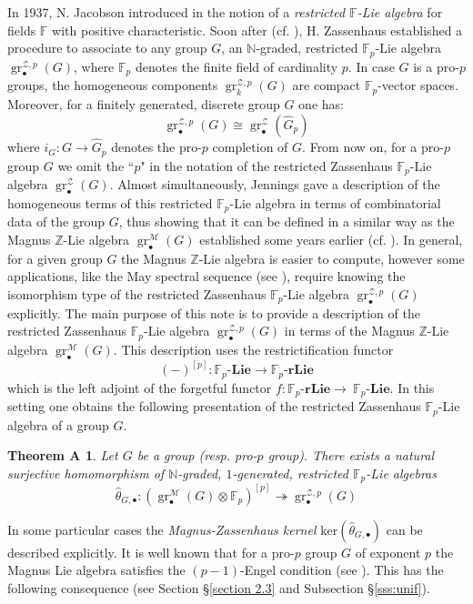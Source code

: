 \documentclass{amsart}
\theoremstyle{plain}
\newtheorem*{thmA}{Theorem A}
\theoremstyle{definition}
\numberwithin{theorem}{section}
\numberwithin{equation}{section}
\newcommand{\gr}{\operatorname{gr}}
\newcommand{\grM}{\operatorname{gr}^{\mathscr M}}
\newcommand{\grZ}{\operatorname{gr}^{{\mathcal Z}, p}}
\newcommand{\catlie}{\mathbf{Lie}}
\newcommand{\catReslie}{\mathbf{rLie}}
\newcommand{\FF}{\mathbb{F}}
\newcommand{\Z}{\mathbb Z}
\newcommand{\kernel}{\mathrm{ker}}
\begin{document}
In 1937, N. Jacobson introduced in \cite{Jac37} the notion of a \emph{restricted $\FF$-Lie algebra} for fields $\FF$ with positive characteristic. Soon after (cf. \cite{Zas39}), H. Zassenhaus  established a procedure to associate to any group $G$, an $\mathbb N$-graded, restricted $\FF_p$-Lie algebra $\grZ_\bullet(G)$, where $\FF_p$ denotes the finite field of cardinality $p$. In case $G$ is a pro-$p$ groups, the homogeneous components $\grZ_k(G)$ are compact $\FF_p$-vector spaces. Moreover, for a finitely generated, discrete group $G$ one has:
\begin{equation}\label{eq:grz.pro-p.completion}
    \grZ_\bullet(G) \cong \gr^{\mathcal Z}_\bullet(\hat G_{p})
\end{equation}
where $i_G : G \to \hat G_{p}$ denotes the pro-$p$ completion of $G$. From now on, for a pro-$p$ group $G$ we omit the ``$p$" %
in the notation of the restricted Zassenhaus $\FF_p$-Lie algebra $\gr^{\mathcal Z}_\bullet(G)$.
\noindent
 Almost simultaneously, Jennings gave a description of the homogeneous terms of this restricted $\FF_p$-Lie algebra in terms of combinatorial data of the group $G$, thus showing that it can be defined in a similar way as the Magnus $\Z$-Lie algebra $\grM_\bullet(G)$ established some years earlier (cf. \cite{Mag37} \cite{Mag40}). 
\noindent
In general, for a given group $G$ the Magnus $\Z$-Lie algebra is easier to compute, however some applications, like the May spectral sequence (see \cite{Day94} \cite{Leo24}), require knowing the isomorphism type of the restricted Zassenhaus $\FF_p$-Lie algebra $\grZ_\bullet(G)$ explicitly. 
\noindent
The main purpose of this note is to provide a description of the restricted Zassenhaus $\FF_p$-Lie algebra $\grZ_\bullet(G)$ in terms of the Magnus $\Z$-Lie algebra $\grM_\bullet(G)$. 
This description uses the restrictification functor 
\begin{equation}\label{eq:restrictification.functor}
    (-)^{[p]} : \FF_p\text{-}\catlie \longrightarrow \FF_p\text{-}\catReslie
\end{equation}
which is the left adjoint of the forgetful functor $f :\FF_p\text{-}\catReslie \longrightarrow\ \FF_p\text{-}\catlie$.
In this setting one obtains the following presentation of the restricted Zassenhaus $\FF_p$-Lie algebra of a group $G$.
\begin{thmA}
    Let $G$ be a group (resp. pro-$p$ group). There exists a natural surjective homomorphism of $\mathbb N$-graded, $1$-generated, restricted $\FF_p$-Lie algebras
    \begin{equation}\label{eq:pres}
        \hat\theta_{G, \bullet} : (\grM_\bullet(G)\otimes \FF_p)^{[p]} \twoheadrightarrow \grZ_\bullet(G) 
    \end{equation}
\end{thmA}
\noindent
In some particular cases the \emph{Magnus-Zassenhaus kernel} $\kernel(\hat\theta_{G, \bullet})$ can be described explicitly.
It is well known that for a pro-$p$ group $G$ of exponent $p$ the Magnus Lie algebra satisfies the $(p-1)$-Engel condition (see \cite{Kuh93}). This has the following consequence (see Section \S\ref{section 2.3}
and Subsection \S\ref{sss:unif}).
\end{document}
